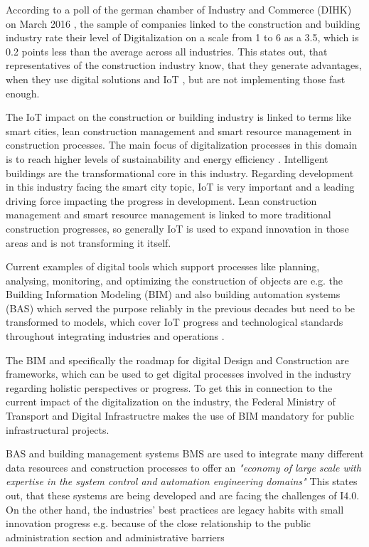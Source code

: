 
According to a poll of the german chamber of Industry and Commerce (\ac{DIHK}) on March 2016 \cite[]{barometer:2016}, the sample of companies linked to the construction and building industry rate their level of Digitalization on a scale from 1 to 6 as a 3.5, which is 0.2 points less than the average across all industries.\cite[p.5]{barometer:2016} This states out, that representatives of the construction industry know, that they generate advantages, when they use digital solutions and \ac{IoT} \cite[p.7-8]{barometer:2016}, but are not implementing those fast enough.

The \ac{IoT} impact on the construction or building industry is linked to terms like smart cities, lean construction management and smart resource management in construction processes. The main focus of digitalization processes in this domain is to reach higher levels of sustainability and energy efficiency \cite{Lilis2017473}.
Intelligent buildings are the transformational core in this industry. Regarding development in this industry facing the smart city topic, \ac{IoT} is very important and a leading driving force impacting the progress in development. Lean construction management and smart resource management is linked to more traditional construction progresses, so generally \ac{IoT} is used to expand innovation in those areas and is not transforming it itself.

Current examples of digital tools which support processes like planning, analysing, monitoring, and optimizing the construction of objects are e.g. the Building Information Modeling (\ac{BIM}) and also building automation systems (\ac{BAS}) which served the purpose reliably in the previous decades but need to be transformed to models, which cover \ac{IoT} progress and technological standards throughout integrating industries and operations \cite{Lilis2017473}.

The \ac{BIM} and specifically the roadmap for digital Design and Construction \cite{FederalMinRoadMapConstruction}
are frameworks, which can be used to get digital processes involved in the industry regarding holistic perspectives or progress. To get this in connection to the current impact of the digitalization on the industry, the Federal Ministry of Transport and Digital Infrastructre makes the use of BIM mandatory for public infrastructural projects.\cite{FederalMinRoadMapConstruction}

\ac{BAS} and building management systems \ac{BMS} are used to integrate many different data resources and construction processes to offer an \emph{"economy of large scale with expertise in the system control and automation engineering domains"} \cite[p.475]{Lilis2017473} %
This states out, that these systems are being developed and are facing the challenges of \ac{I4.0}. On the other hand, the industries' best practices are legacy habits with small innovation progress e.g. because of the close relationship to the public administration section and administrative barriers \cite{Oesterreich2016121}

